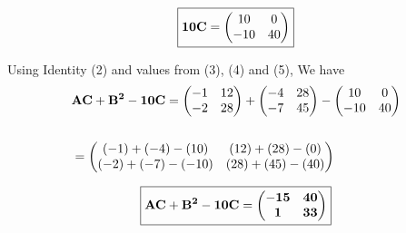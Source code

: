 \documentclass[journal,12pt,twocolumn]{IEEEtran}
\begin{document}
      \begin{equation}
      \boxed{\mathbf{10C}=
     \begin{pmatrix} 
        10 & 0 \\
        -10 & 40
      \end{pmatrix} 
      }
    \end{equation}
  
    
    Using Identity (2) and values from (3), (4) and (5), We have
    \begin{align*}
      &\mathbf{AC+B^2-10C}= 
     \begin{pmatrix} 
        -1 & 12 \\
        -2 & 28
      \end{pmatrix} 
      +
     \begin{pmatrix} 
        -4 & 28 \\
        -7 & 45
      \end{pmatrix} 
      -
     \begin{pmatrix} 
        10 & 0 \\
        -10 & 40
      \end{pmatrix} 
    \\
    \\
    &=
     \begin{pmatrix} 
        (-1)+(-4)-(10) & (12)+(28)-(0) \\
        (-2)+(-7)-(-10) & (28)+(45)-(40)
      \end{pmatrix} 
    \end{align*}
    
    \begin{equation*}
      \boxed{\mathbf{\mathbf{AC+B^2-10C}} =
       \begin{pmatrix} 
          \mathbf{-15} & \mathbf{40} \\
          \mathbf{1} & \mathbf{33}
        \end{pmatrix} 
        }  
    \end{equation*}
\end{document}
